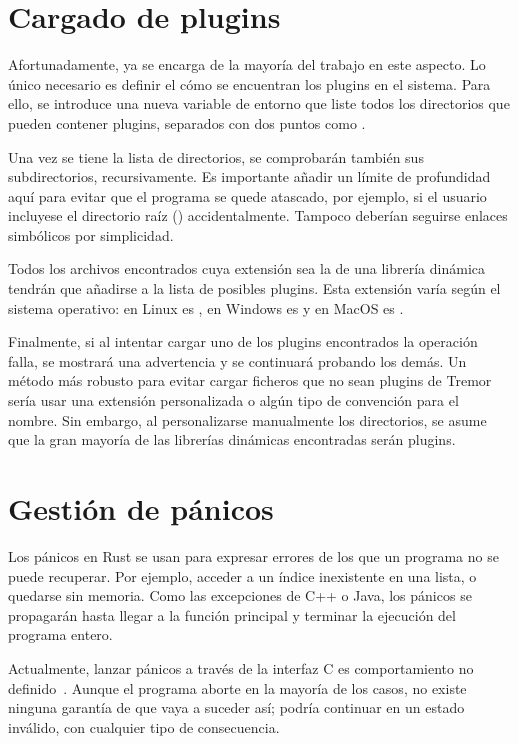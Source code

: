 \section{Cargado de plugins}

Afortunadamente, \abistable ya se encarga de la mayoría del trabajo en este
aspecto. Lo único necesario es definir el cómo se encuentran los plugins en el
sistema. Para ello, se introduce una nueva variable de entorno
 que liste todos los directorios que pueden contener
plugins, separados con dos puntos como .

Una vez se tiene la lista de directorios, se comprobarán también sus
subdirectorios, recursivamente. Es importante añadir un límite de profundidad
aquí para evitar que el programa se quede atascado, por ejemplo, si el usuario
incluyese el directorio raíz (\code{/}) accidentalmente. Tampoco deberían
seguirse enlaces simbólicos por simplicidad.

Todos los archivos encontrados cuya extensión sea la de una librería dinámica
tendrán que añadirse a la lista de posibles plugins. Esta extensión varía según
el sistema operativo: en Linux es , en Windows es  y en
MacOS es .

Finalmente, si al intentar cargar uno de los plugins encontrados la operación
falla, se mostrará una advertencia y se continuará probando los demás. Un método
más robusto para evitar cargar ficheros que no sean plugins de Tremor sería usar
una extensión personalizada o algún tipo de convención para el nombre. Sin
embargo, al personalizarse manualmente los directorios, se asume que la gran
mayoría de las librerías dinámicas encontradas serán plugins.

\section{Gestión de pánicos}\label{sec:panics}

Los pánicos en Rust se usan para expresar errores de los que un programa no se
puede recuperar. Por ejemplo, acceder a un índice inexistente en una lista, o
quedarse sin memoria. Como las excepciones de C++ o Java, los pánicos se
propagarán hasta llegar a la función principal y terminar la ejecución del
programa entero.

Actualmente, lanzar pánicos a través de la interfaz C es comportamiento no
definido~\cite[FFI and Panics]{nomicon}. Aunque el programa aborte en la mayoría
de los casos, no existe ninguna garantía de que vaya a suceder así; podría
continuar en un estado inválido, con cualquier tipo de consecuencia.

